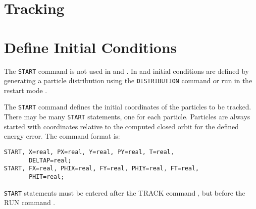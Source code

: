 
\section{Tracking}

\section{Define Initial Conditions}
\label{sec:trackstart}
The \texttt{START} command is not used in \noopalt and \noopalcycl. In
\opalt and \opalcycl initial conditions are defined by generating a particle
distribution using the \texttt{DISTRIBUTION} command  or
run \opal in the restart mode .

The \texttt{START} command defines the initial coordinates of
the particles to be tracked.
There may be many \texttt{START} statements, one for each particle.
Particles are always started with coordinates relative
to the computed closed orbit for the defined energy error.
The command format is:
\begin{verbatim}
START, X=real, PX=real, Y=real, PY=real, T=real,
       DELTAP=real;
START, FX=real, PHIX=real, FY=real, PHIY=real, FT=real,
       PHIT=real;
\end{verbatim}
\texttt{START} statements must be entered after the
{TRACK} command ,
but before the {RUN} command .

